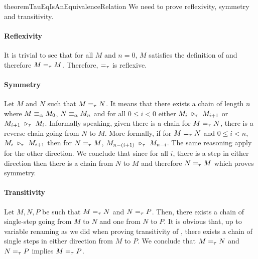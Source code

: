 \begin{longproof}{theoremTauEqIsAnEquivalenceRelation}
We need to prove reflexivity, symmetry and transitivity.

\paragraph{Reflexivity}
It is trivial to see that for all $M$ and $n=0$, $M$ satisfies the definition of \tauconversion and therefore $M =_{\tau} M$. Therefore, $=_{\tau}$ is reflexive.

\paragraph{Symmetry}
Let $M$ and $N$ such that $M =_{\tau} N$. It means that there exists a chain of length $n$ where $M \equiv_\alpha M_{0}$, $N \equiv_\alpha M_{n}$ and for all $0 \leq i < 0$ either $M_{i} \ \triangleright_{\tau}\  M_{i+1}$ or $M_{i+1} \ \triangleright_{\tau}\  M_{i}$. Informally speaking, given there is a chain for $M =_{\tau} N$, there is a reverse chain going from $N$ to $M$. More formally, if for $M =_{\tau} N$ and $0 \leq i < n$, $M_i \ \triangleright_{\tau}\  M_{i+1}$ then for $N =_{\tau} M$, $M_{n-(i+1)} \ \triangleright_{\tau}\  M_{n-i}$. The same reasoning apply for the other direction. We conclude that since for all $i$, there is a step in either direction then there is a chain from $N$ to $M$ and therefore $N =_{\tau} M$ which proves symmetry.

\paragraph{Transitivity}
Let $M, N, P$ be such that $M =_{\tau} N$ and $N =_{\tau} P$. Then, there exists a chain of single-step \taureduction going from $M$ to $N$ and one from $N$ to $P$. It is obvious that, up to variable renaming as we did when proving transitivity of \taureduction, there exists a chain of single steps in either direction from $M$ to $P$. We conclude that $M =_{\tau} N$ and $N =_{\tau} P$ implies $M =_{\tau} P$.
\end{longproof}